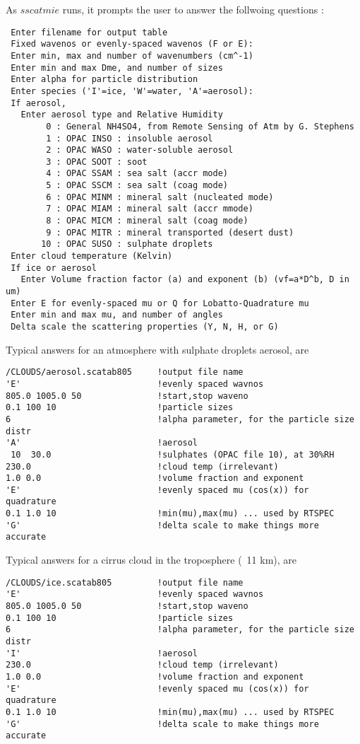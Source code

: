 \documentclass[12pt]{article}
\begin{document}
As $sscatmie$ runs, it prompts the user to answer the follwoing questions :
\begin{verbatim}
 Enter filename for output table
 Fixed wavenos or evenly-spaced wavenos (F or E):
 Enter min, max and number of wavenumbers (cm^-1)
 Enter min and max Dme, and number of sizes
 Enter alpha for particle distribution
 Enter species ('I'=ice, 'W'=water, 'A'=aerosol):
 If aerosol, 
   Enter aerosol type and Relative Humidity
        0 : General NH4SO4, from Remote Sensing of Atm by G. Stephens
        1 : OPAC INSO : insoluble aerosol
        2 : OPAC WASO : water-soluble aerosol
        3 : OPAC SOOT : soot
        4 : OPAC SSAM : sea salt (accr mode)
        5 : OPAC SSCM : sea salt (coag mode)
        6 : OPAC MINM : mineral salt (nucleated mode)
        7 : OPAC MIAM : mineral salt (accr mmode)
        8 : OPAC MICM : mineral salt (coag mode)
        9 : OPAC MITR : mineral transported (desert dust)
       10 : OPAC SUSO : sulphate droplets
 Enter cloud temperature (Kelvin)
 If ice or aerosol
   Enter Volume fraction factor (a) and exponent (b) (vf=a*D^b, D in um)
 Enter E for evenly-spaced mu or Q for Lobatto-Quadrature mu
 Enter min and max mu, and number of angles
 Delta scale the scattering properties (Y, N, H, or G)
\end{verbatim}

Typical answers for an atmosphere with sulphate droplets aerosol, are
\begin{verbatim}
/CLOUDS/aerosol.scatab805     !output file name
'E'                           !evenly spaced wavnos
805.0 1005.0 50               !start,stop waveno
0.1 100 10                    !particle sizes
6                             !alpha parameter, for the particle size distr
'A'                           !aerosol   
 10  30.0                     !sulphates (OPAC file 10), at 30%RH
230.0                         !cloud temp (irrelevant)
1.0 0.0                       !volume fraction and exponent
'E'                           !evenly spaced mu (cos(x)) for quadrature
0.1 1.0 10                    !min(mu),max(mu) ... used by RTSPEC
'G'                           !delta scale to make things more accurate
\end{verbatim}

Typical answers for a cirrus cloud in the troposphere (~11 km), are
\begin{verbatim}
/CLOUDS/ice.scatab805         !output file name
'E'                           !evenly spaced wavnos
805.0 1005.0 50               !start,stop waveno
0.1 100 10                    !particle sizes
6                             !alpha parameter, for the particle size distr
'I'                           !aerosol   
230.0                         !cloud temp (irrelevant)
1.0 0.0                       !volume fraction and exponent
'E'                           !evenly spaced mu (cos(x)) for quadrature
0.1 1.0 10                    !min(mu),max(mu) ... used by RTSPEC
'G'                           !delta scale to make things more accurate
\end{verbatim}
\end{document}
